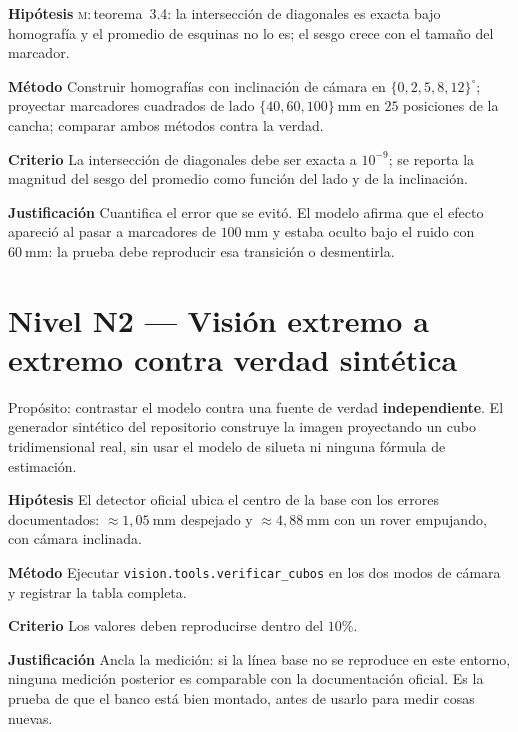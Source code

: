 \documentclass[11pt,a4paper]{article}
\newcommand{\grados}{^{\circ}}
\newenvironment{prueba}[2]{%
  \par\medskip\noindent
  \begin{tcolorbox}[enhanced,breakable,colback=white,colframe=black!45,
    boxrule=0.5pt,arc=1pt,left=6pt,right=6pt,top=4pt,bottom=4pt,
    title={\bfseries #1\quad\normalfont #2},
    colbacktitle=black!8,coltitle=black,fonttitle=\bfseries\small]
  \small
}{\end{tcolorbox}\par\medskip}
\newcommand{\campo}[1]{\par\smallskip\noindent\textbf{#1}\quad\ignorespaces}
\begin{document}
\begin{prueba}{N1.17}{Sesgo del centro por promedio bajo perspectiva}
\campo{Hipótesis} \textsc{m}:\,teorema~3.4: la intersección de diagonales es exacta bajo
homografía y el promedio de esquinas no lo es; el sesgo crece con el tamaño del
marcador.
\campo{Método} Construir homografías con inclinación de cámara en
$\{0,2,5,8,12\}\grados$; proyectar marcadores cuadrados de lado
$\{40, 60, 100\}\ \mathrm{mm}$ en $25$ posiciones de la cancha; comparar ambos métodos
contra la verdad.
\campo{Criterio} La intersección de diagonales debe ser exacta a $10^{-9}$; se reporta
la magnitud del sesgo del promedio como función del lado y de la inclinación.
\campo{Justificación} Cuantifica el error que se evitó. El modelo afirma que el efecto
apareció al pasar a marcadores de $100\ \mathrm{mm}$ y estaba oculto bajo el ruido con
$60\ \mathrm{mm}$: la prueba debe reproducir esa transición o desmentirla.
\end{prueba}

\section{Nivel N2 --- Visión extremo a extremo contra verdad sintética}

Propósito: contrastar el modelo contra una fuente de verdad \textbf{independiente}. El
generador sintético del repositorio construye la imagen proyectando un cubo
tridimensional real, sin usar el modelo de silueta ni ninguna fórmula de estimación.

\begin{prueba}{N2.1}{Reproducción de la línea base oficial de posición}
\campo{Hipótesis} El detector oficial ubica el centro de la base con los errores
documentados: $\approx1{,}05\ \mathrm{mm}$ despejado y $\approx4{,}88\ \mathrm{mm}$ con
un rover empujando, con cámara inclinada.
\campo{Método} Ejecutar \texttt{vision.tools.verificar\_cubos} en los dos modos de
cámara y registrar la tabla completa.
\campo{Criterio} Los valores deben reproducirse dentro del $10\%$.
\campo{Justificación} Ancla la medición: si la línea base no se reproduce en este
entorno, ninguna medición posterior es comparable con la documentación oficial. Es la
prueba de que el banco está bien montado, antes de usarlo para medir cosas nuevas.
\end{prueba}
\end{document}
